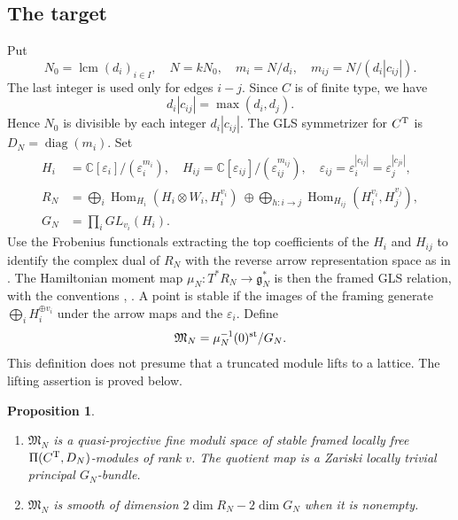 \documentclass[11pt,reqno]{amsart}
\newtheorem{Proposition}[Theorem]{Proposition}
\theoremstyle{definition}
\theoremstyle{remark}
\def\bbC{\mathbb C}
\def\Hom{\operatorname{Hom}}
\begin{document}
\subsection{The target}\label{app:target}
Put
\[
 N_0=\operatorname{lcm}(d_i)_{i\in I},\quad N=kN_0,\quad
 m_i=N/d_i,\quad m_{ij}=N/(d_i|c_{ij}|).
\]
The last integer is used only for edges $i-j$. 
Since $C$ is of finite type, we have
$$d_i|c_{ij}|=\max(d_i,d_j).$$ 
Hence $N_0$ is divisible by each 
integer $d_i|c_{ij}|$. The GLS symmetrizer for $C^{\rm T}$ is
$D_N=\operatorname{diag}(m_i)$. 
Set
\begin{align*}
H_i&=\bbC[\varepsilon_i]/(\varepsilon_i^{m_i}),\quad
 H_{ij}=\bbC[\varepsilon_{ij}]/(\varepsilon_{ij}^{m_{ij}}),
 \quad \varepsilon_{ij}=\varepsilon_i^{|c_{ij}|}
                         =\varepsilon_j^{|c_{ji}|},\\
 R_N&=\bigoplus_i\Hom_{H_i}(H_i\otimes W_i,H_i^{v_i})
 \ \oplus\!\bigoplus_{h:i\to j}
       \Hom_{H_{ij}}(H_i^{v_i},H_j^{v_j}),\\
 G_N&=\prod_iGL_{v_i}(H_i).
\end{align*}
Use the Frobenius functionals extracting the top coefficients of the
$H_i$ and $H_{ij}$ to identify the complex dual of $R_N$ with the
reverse arrow representation space as in \cite{VV23}. The Hamiltonian moment map 
$\mu_N:T^*R_N\to\mathfrak g_N^*$
 is then the framed GLS relation, with the conventions
\cite[\S8]{GLS}, \cite[Prop.~2.4]{HJV26}.
A point is stable if the images of the framing generate
$\bigoplus_iH_i^{\oplus v_i}$ under the arrow maps and the $\varepsilon_i$.
Define
\begin{align}\label{MN}\mathfrak M_N=\mu_N^{-1}(0)^{\rm st}/G_N.
\end{align}
This definition does not presume that a truncated module lifts to a
lattice. The lifting assertion is proved below.

\begin{Proposition}\label{prop:MN}\hfill
\begin{enumerate}[label=$\mathrm{(\alph*)}$,leftmargin=8mm]
\item $\mathfrak M_N$ is a quasi-projective fine moduli space of stable
framed locally free $\Pi(C^{\rm T},D_N)$-modules of rank $v$.
The quotient map is a Zariski locally trivial principal $G_N$-bundle.
\item $\mathfrak M_N$ is smooth of dimension
$2\dim R_N-2\dim G_N$ when it is nonempty.
\end{enumerate}
\end{Proposition}
\end{document}
